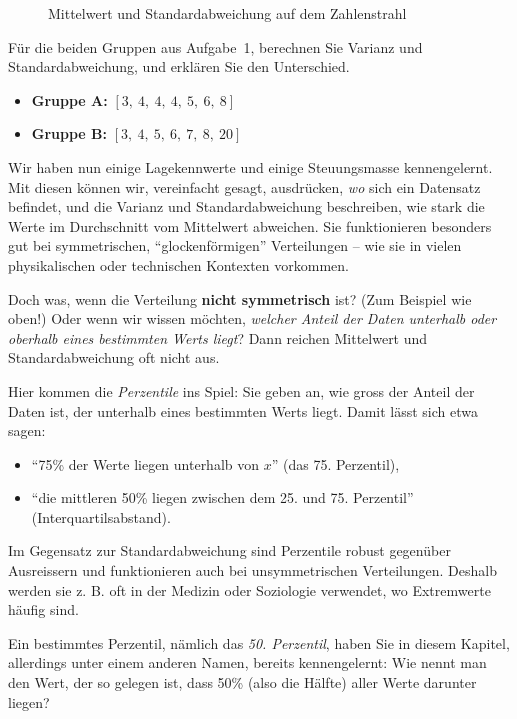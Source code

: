 \begin{lpu}
\begin{figure}[h]
\begin{tikzpicture}[scale=0.3]
\end{tikzpicture}
\caption{Mittelwert und Standardabweichung auf dem Zahlenstrahl}
\end{figure}



\begin{aufgabe}{2}
Für die beiden Gruppen aus Aufgabe~1, berechnen Sie Varianz und Standardabweichung, und erklären Sie den Unterschied.
\begin{itemize}
\item \textbf{Gruppe A:} $[3,\ 4,\ 4,\ 4,\ 5,\ 6,\ 8]$
\item \textbf{Gruppe B:} $[3,\ 4,\ 5,\ 6,\ 7,\ 8,\ 20]$
\end{itemize}
\end{aufgabe}

Wir haben nun einige Lagekennwerte und einige Steuungsmasse kennengelernt. Mit diesen können wir, vereinfacht gesagt, ausdrücken, \textit{wo} sich ein Datensatz befindet, und die Varianz und Standardabweichung beschreiben, wie stark die Werte im Durchschnitt vom Mittelwert abweichen. Sie funktionieren besonders gut bei symmetrischen, ``glockenförmigen'' Verteilungen – wie sie in vielen physikalischen oder technischen Kontexten vorkommen.

Doch was, wenn die Verteilung \textbf{nicht symmetrisch} ist? (Zum Beispiel wie oben!) Oder wenn wir wissen möchten, \emph{welcher Anteil der Daten unterhalb oder oberhalb eines bestimmten Werts liegt}? Dann reichen Mittelwert und Standardabweichung oft nicht aus.

Hier kommen die \textit{Perzentile} ins Spiel: Sie geben an, wie gross der Anteil der Daten ist, der unterhalb eines bestimmten Werts liegt. Damit lässt sich etwa sagen:

\begin{itemize}
  \item ``75\% der Werte liegen unterhalb von $x$'' (das 75. Perzentil),
  \item ``die mittleren 50\% liegen zwischen dem 25. und 75. Perzentil'' (Interquartilsabstand).
\end{itemize}

Im Gegensatz zur Standardabweichung sind Perzentile robust gegenüber Ausreissern und funktionieren auch bei unsymmetrischen Verteilungen. Deshalb werden sie z. B. oft in der Medizin oder Soziologie verwendet, wo Extremwerte häufig sind.

\begin{aufgabe}{3}
Ein bestimmtes Perzentil, nämlich das \textit{50. Perzentil}, haben Sie in diesem Kapitel, allerdings unter einem anderen Namen, bereits kennengelernt: Wie nennt man den Wert, der so gelegen ist, dass 50\% (also die Hälfte) aller Werte darunter liegen?
\end{aufgabe}



\end{lpu}
